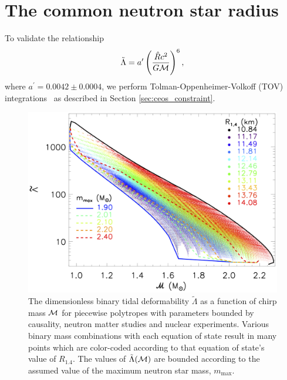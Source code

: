 \section{The common neutron star radius}\label{sec:ceos_radius}

To validate the relationship
\begin{equation}
\tilde{\Lambda}=a^\prime\left(\frac{\hat{R}c^2}{G{\cal M}}\right)^6,
\label{eq:lambda_t2_supp}\end{equation}
where $a^\prime=0.0042\pm0.0004$, we perform Tolman-Oppenheimer-Volkoff (TOV) integrations~\cite{Oppenheimer:1939ne} as described in Section \ref{sec:ceos_constraint}.
\begin{figure}[b]
  \includegraphics[width=\columnwidth]{figures/common_eos/lambdatilde_mchirp.png}
  \caption{The dimensionless binary tidal deformability $\tilde \Lambda$ as a function of chirp mass $\cal{M}$ for piecewise polytropes with parameters bounded by causality, neutron matter studies and nuclear experiments. Various binary mass combinations with each equation of state result in many points which are color-coded according to that equation of state's value of $R_{1.4}$.  The values of $\tilde\Lambda(\cal{M})$ are bounded according to the assumed value of the maximum neutron star mass, $m_\mathrm{max}$. \label{fig:lambar-mass}}
\end{figure}

